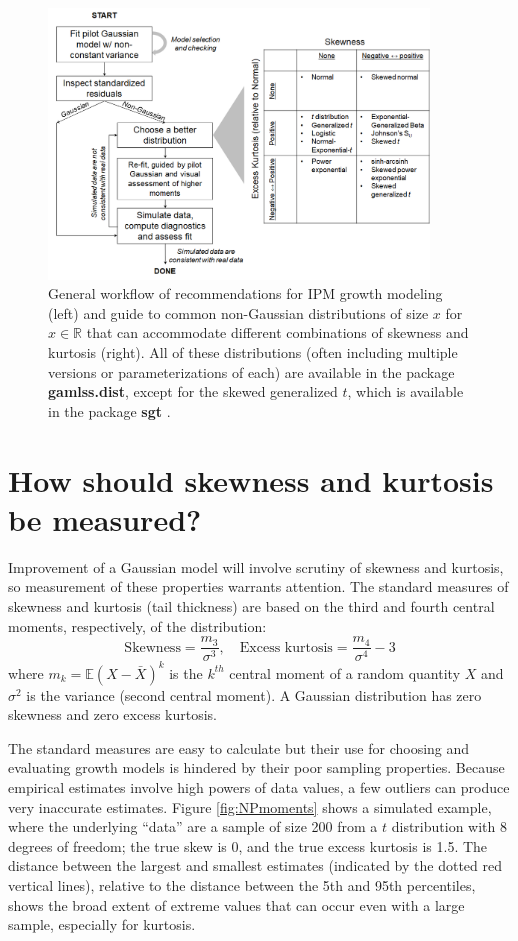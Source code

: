 \documentclass[12pt]{article}
\newcounter{box}
\newcommand{\be}{\begin{equation}}
\newcommand{\ee}{\end{equation}}
\begin{document}
\begin{figure}
\centering
\includegraphics[width=0.9\textwidth]{figures/workflow.png}
\caption{General workflow of recommendations for IPM growth modeling (left) and guide to common non-Gaussian distributions of size $x$ for $x \in \mathbb{R}$ that can accommodate different combinations of skewness and kurtosis (right). 
All of these distributions (often including multiple versions or parameterizations of each) are available in the package \textbf{gamlss.dist}, 
except for the skewed generalized $t$, which is available in the package \textbf{sgt} \citep{davis-2015}.}
\label{fig:workflow}
\end{figure} 

\section{How should skewness and kurtosis be measured?}
\label{sec:NPmeasures} 
Improvement of a Gaussian model will involve scrutiny of skewness and kurtosis, so measurement of these properties warrants attention. 
The standard measures of skewness and kurtosis (tail thickness) are based on the third and fourth central moments, respectively, of the distribution: 
\be
\mbox{Skewness} = \frac{m_3}{\sigma^3}, \quad \mbox{Excess kurtosis} = \frac{m_4}{\sigma^4}-3
\ee
where $m_k = \mathbb{E}(X - \bar{X})^k$ is the $k^{th}$ central moment of a random quantity $X$ 
and $\sigma^2$ is the variance (second central moment). 
A Gaussian distribution has zero skewness and zero excess kurtosis. 

The standard measures are easy to calculate but their use for choosing and evaluating growth models is hindered by their poor sampling properties. 
Because empirical estimates involve high powers of data values, a few outliers can produce very inaccurate estimates. 
Figure \ref{fig:NPmoments} shows a simulated example, where the underlying ``data'' are a sample of size 200 from a $t$ distribution with 
8 degrees of freedom; the true skew is 0, and the true excess kurtosis is 1.5. 
The distance between the largest and smallest estimates (indicated by the dotted red vertical lines), relative to the distance 
between the 5th and 95th percentiles, shows the broad extent of extreme values that can occur even with a large sample, especially for kurtosis. 
\end{document}
